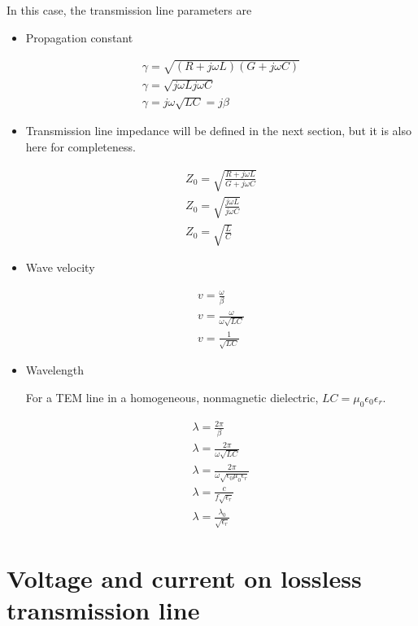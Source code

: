 \documentclass{ximera}
\begin{document}
In this case, the transmission line parameters are
\begin{itemize}
\item Propagation constant


\begin{eqnarray}
\gamma =\sqrt{(R+j\omega L)(G+ j\omega C)} \nonumber   \\ \nonumber
\gamma= \sqrt{j \omega L j \omega C} \\ \nonumber
\gamma = j \omega \sqrt{L C} = j \beta
\end{eqnarray}

\item Transmission line impedance will be defined in the next section, but it is also here for completeness.

\begin{eqnarray}
Z_0=\sqrt{\frac{R+j\omega L}{G+ j\omega C}} \nonumber  \\ \nonumber
Z_0=\sqrt{\frac{j\omega L}{ j\omega C}} \\ \nonumber
Z_0=\sqrt{\frac{L}{C}}
\end{eqnarray}

\item Wave velocity

\begin{eqnarray}
v=\frac{\omega}{\beta}  \nonumber \\ \nonumber
v=\frac{\omega}{\omega \sqrt{LC}} \\ \nonumber
v=\frac{1}{\sqrt{LC}}
\end{eqnarray}


\item Wavelength

For a TEM line in a homogeneous, nonmagnetic dielectric,
$LC=\mu_0\epsilon_0\epsilon_r$.

\begin{eqnarray}
\lambda = \frac{2 \pi}{\beta}  \nonumber \\ \nonumber
\lambda = \frac{2 \pi}{ \omega \sqrt{LC}} \\ \nonumber
\lambda = \frac{2\pi}{\omega\sqrt{\epsilon_0\mu_0\epsilon_r}} \\ \nonumber
\lambda = \frac{c}{f \sqrt{\epsilon_r}} \\ \nonumber
\lambda = \frac{\lambda_0}{\sqrt{\epsilon_r}} \nonumber
\end{eqnarray}
\end{itemize}




\section{Voltage and current on lossless transmission line}
\end{document}
